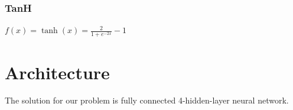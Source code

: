 \documentclass[journal, a4paper]{IEEEtran}
\begin{document}
\subsubsection{TanH}
\begin{center}
$ f(x)=\tanh(x)=\frac{2}{1+e^{-2x}}-1 $ \\
\end{center}

\section{Architecture}
The solution for our problem is fully connected 4-hidden-layer neural network.
\end{document}
